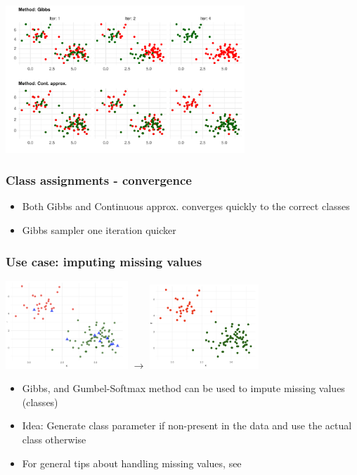 \documentclass[10pt]{beamer}
\begin{document}
\begin{frame}
	\centering
	\includegraphics[width=9cm]{figs/iters.pdf}
	\frametitle{Class assignments - convergence}
	\begin{itemize}
		\item Both Gibbs and Continuous approx. converges quickly to the correct classes
		\item Gibbs sampler one iteration quicker
		\end{itemize}
	\end{frame}

\begin{frame}
	\frametitle{Use case: imputing missing values}
	\centering
	\includegraphics[width=4.6cm]{figs/preimpute.png}
	$\to$
	\includegraphics[width=4.1cm]{figs/postimpute.png}
	\begin{itemize}
		\item Gibbs, and Gumbel-Softmax method can be used to impute missing values (classes)
		\item Idea: Generate class parameter if  non-present in the data and use the actual class otherwise
		\item For general tips about handling missing values, see \cite{stanmissing}
	\end{itemize}
\end{frame}
\end{document}
